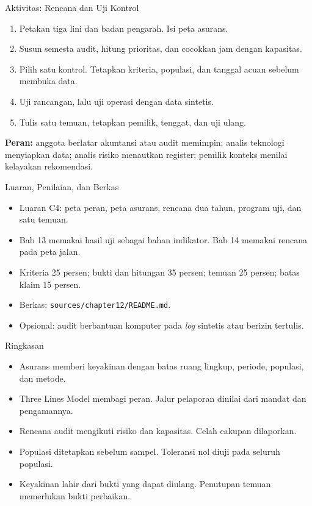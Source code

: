 \documentclass[aspectratio=169, table, 12pt]{beamer}
\begin{document}
\begin{frame}{{\Large Aktivitas: Rencana dan Uji Kontrol}}
  \vspace{2pt}
  \small
  \begin{enumerate}
    \item Petakan tiga lini dan badan pengarah. Isi peta asurans.
    \item Susun semesta audit, hitung prioritas, dan cocokkan jam dengan kapasitas.
    \item Pilih satu kontrol. Tetapkan kriteria, populasi, dan tanggal acuan sebelum membuka data.
    \item Uji rancangan, lalu uji operasi dengan data sintetis.
    \item Tulis satu temuan, tetapkan pemilik, tenggat, dan uji ulang.
  \end{enumerate}

  \vspace{4pt}
  \scriptsize \textbf{Peran:} anggota berlatar akuntansi atau audit memimpin; analis teknologi
  menyiapkan data; analis risiko menautkan register; pemilik konteks menilai kelayakan rekomendasi.
\end{frame}

\begin{frame}{{\Large Luaran, Penilaian, dan Berkas}}
  \vspace{6pt}
  \small
  \begin{itemize}
    \item Luaran C4: peta peran, peta asurans, rencana dua tahun, program uji, dan satu temuan.
    \item Bab 13 memakai hasil uji sebagai bahan indikator. Bab 14 memakai rencana pada peta jalan.
    \item Kriteria 25 persen; bukti dan hitungan 35 persen; temuan 25 persen; batas klaim 15 persen.
    \item Berkas: \texttt{sources/chapter12/README.md}.
    \item Opsional: audit berbantuan komputer pada \textit{log} sintetis atau berizin tertulis.
  \end{itemize}
\end{frame}

\begin{frame}{{\Large Ringkasan}}
  \vspace{6pt}
  \small
  \begin{itemize}
    \item Asurans memberi keyakinan dengan batas ruang lingkup, periode, populasi, dan metode.
    \item Three Lines Model membagi peran. Jalur pelaporan dinilai dari mandat dan pengamannya.
    \item Rencana audit mengikuti risiko dan kapasitas. Celah cakupan dilaporkan.
    \item Populasi ditetapkan sebelum sampel. Toleransi nol diuji pada seluruh populasi.
    \item Keyakinan lahir dari bukti yang dapat diulang. Penutupan temuan memerlukan bukti
          perbaikan.
  \end{itemize}
\end{frame}
\end{document}
